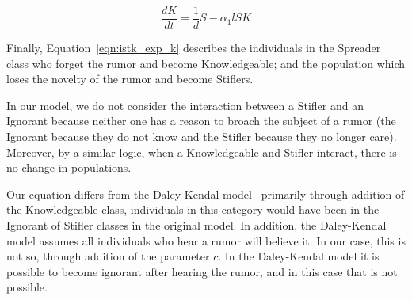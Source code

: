 \begin{equation}
\label{eqn:istk_exp_k} \frac{dK}{dt} = \frac{1}{d}S - \alpha_1l SK
\end{equation}

Finally, Equation~\ref{eqn:istk_exp_k} describes the individuals in the Spreader class who forget the rumor and become Knowledgeable; and the population which loses the novelty of the rumor and become Stiflers.

In our model, we do not consider the interaction between a Stifler and an Ignorant because neither one has a reason to broach the subject of a rumor (the Ignorant because they do not know and the Stifler because they no longer care).
Moreover, by a similar logic, when a Knowledgeable and Stifler interact, there is no change in populations.


Our equation differs from the  Daley-Kendal model~\cite{daley-1965} primarily through addition of the Knowledgeable class, individuals in this category would have been in the Ignorant of Stifler classes in the original model.
In addition, the Daley-Kendal model assumes all individuals who hear a rumor will believe it.
In our case, this is not so, through addition of the parameter $ c $.
In the Daley-Kendal model it is possible to become ignorant after hearing the rumor, and in this case that is not possible.
